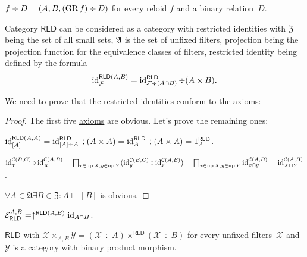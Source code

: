 \begin{defn}
  $f \div D = (A, B, (\operatorname{GR} f) \div D)$ for every
  reloid $f$ and a binary relation~$D$.
\end{defn}

Category $\mathsf{RLD}$
can be considered as a category with restricted identities
with $\mathfrak{Z}$ being the set of all
small sets, $\mathfrak{A}$ is the set of unfixed filters,
projection being the projection function for the
equivalence classes of filters,
restricted identity being defined by the formula
\[\operatorname{id}^{\mathsf{RLD}(A,B)}_{\mathcal{F}} =
\operatorname{id}^{\mathsf{RLD}}_{\mathcal{F}\div(A\cap B)}
\div(A\times B).\]

We need to prove that the restricted identities
conform to the axioms:

\begin{proof}
The first five \hyperref[unf-mor]{axioms} are obvious. Let's prove the
remaining ones:

$\operatorname{id}^{\mathsf{RLD}(A,A)}_{[A]} =
\operatorname{id}^{\mathsf{RLD}}_{[A]\div A}\div(A\times A) =
\operatorname{id}^{\mathsf{RLD}}_A\div(A\times A) =
1^{\mathsf{RLD}}_A$.

$\operatorname{id}^{\mathcal{C}(B,C)}_Y \circ \operatorname{id}^{\mathcal{C}(A,B)}_X =
\bigsqcap_{x\in\operatorname{up} X,y\in\operatorname{up} Y}
(\operatorname{id}^{\mathcal{C}(B,C)}_y \circ \operatorname{id}^{\mathcal{C}(A,B)}_x)=
\bigsqcap_{x\in\operatorname{up} X,y\in\operatorname{up} Y}
\operatorname{id}^{\mathcal{C}(A,B)}_{x\cap y}=
\operatorname{id}^{\mathcal{C}(A,B)}_{X\sqcap Y}$.

$\forall A\in\mathfrak{A}\exists B\in\mathfrak{Z}:
A\sqsubseteq[B]$ is obvious.
\end{proof}

\begin{obvious}
$\mathcal{E}_{\mathsf{RLD}}^{A,B} = \uparrow^{\mathsf{RLD} (A ,
B)} \operatorname{id}_{A \cap B}$.
\end{obvious}

\begin{prop}
$\mathsf{RLD}$ with
$\mathcal{X}\times_{A,B}\mathcal{Y}=
(\mathcal{X}\div A)\times^{\mathsf{RLD}}(\mathcal{X}\div B)$
for every unfixed filters~$\mathcal{X}$
and~$\mathcal{Y}$
is a category with binary product morphism.
\end{prop}

